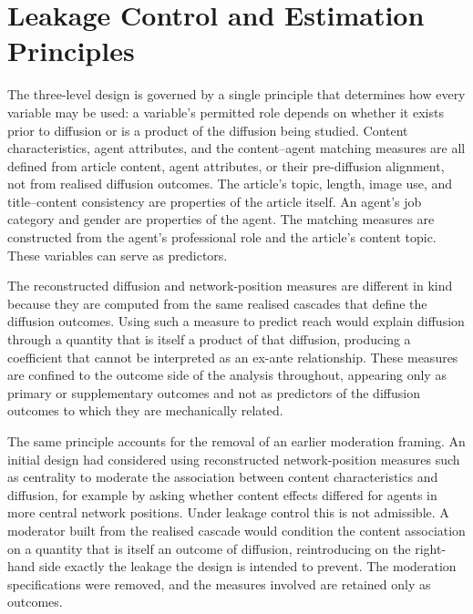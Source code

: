 \section{Leakage Control and Estimation Principles}
\label{sec:5-5-leakage-control-and-estimation-principles}

The three-level design is governed by a single principle that determines how every variable may be used: a variable's permitted role depends on whether it exists prior to diffusion or is a product of the diffusion being studied. Content characteristics, agent attributes, and the content–agent matching measures are all defined from article content, agent attributes, or their pre-diffusion alignment, not from realised diffusion outcomes. The article's topic, length, image use, and title–content consistency are properties of the article itself. An agent's job category and gender are properties of the agent. The matching measures are constructed from the agent's professional role and the article's content topic. These variables can serve as predictors.

The reconstructed diffusion and network-position measures are different in kind because they are computed from the same realised cascades that define the diffusion outcomes. Using such a measure to predict reach would explain diffusion through a quantity that is itself a product of that diffusion, producing a coefficient that cannot be interpreted as an ex-ante relationship. These measures are confined to the outcome side of the analysis throughout, appearing only as primary or supplementary outcomes and not as predictors of the diffusion outcomes to which they are mechanically related.

The same principle accounts for the removal of an earlier moderation framing. An initial design had considered using reconstructed network-position measures such as centrality to moderate the association between content characteristics and diffusion, for example by asking whether content effects differed for agents in more central network positions. Under leakage control this is not admissible. A moderator built from the realised cascade would condition the content association on a quantity that is itself an outcome of diffusion, reintroducing on the right-hand side exactly the leakage the design is intended to prevent. The moderation specifications were removed, and the measures involved are retained only as outcomes.

